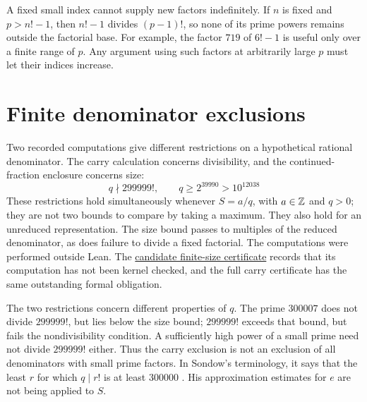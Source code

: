\documentclass[11pt]{article}
\begin{document}
\label{long68:res:split-factor-normalized-collision}
\label{long68:bdry:fixed-owner-absorption}
A fixed small index cannot supply new factors indefinitely. If $n$ is
fixed and $p>n!-1$, then $n!-1$ divides $(p-1)!$, so none of its prime
powers remains outside the factorial base. For example, the factor $719$
of $6!-1$ is useful only over a finite range of $p$. Any argument using
such factors at arbitrarily large $p$ must let their indices increase.

\section{Finite denominator exclusions}\label{long68:sec:finite}
\label{long68:res:lead-denominator-exclusions}
{}

Two recorded computations give different restrictions on a hypothetical
rational denominator. The carry calculation concerns divisibility, and
the continued-fraction enclosure concerns size:
\begin{equation}\label{long68:eq:finite-bounds}
 q\nmid299999!,\qquad q\ge2^{39990}>10^{12038}
\end{equation}
These restrictions hold simultaneously whenever $S=a/q$, with
$a\in\mathbb{Z}$ and $q>0$; they are not two bounds to compare by taking a
maximum. They also hold for an unreduced representation. The size
bound passes to multiples of the reduced denominator, as does failure
to divide a fixed factorial. The computations were performed outside Lean. The
\href{https://github.com/wcook04/plectis-erdos/blob/27c2fc5fe3c55fe547feaeb4c9bb68b3cf63a5bf/lean/ErdosProblems/Erdos68/PaperCompleteFiniteSizeCertificate.lean#L58}{candidate finite-size certificate}
records that its computation has not been kernel checked, and the full
carry certificate has the same outstanding formal obligation.

The two restrictions concern different properties of $q$. The prime
$300007$ does not divide $299999!$, but lies below the size bound;
$299999!$ exceeds that bound, but fails the nondivisibility condition.
A sufficiently high power of a small prime need not divide $299999!$
either. Thus the carry exclusion is not an exclusion of all denominators
with small prime factors. In Sondow's terminology, it says that the least
$r$ for which $q\mid r!$ is at least $300000$
\cite[\S3, Theorem~1]{sondow2006}. His approximation estimates for $e$
are not being applied to $S$.
\end{document}
